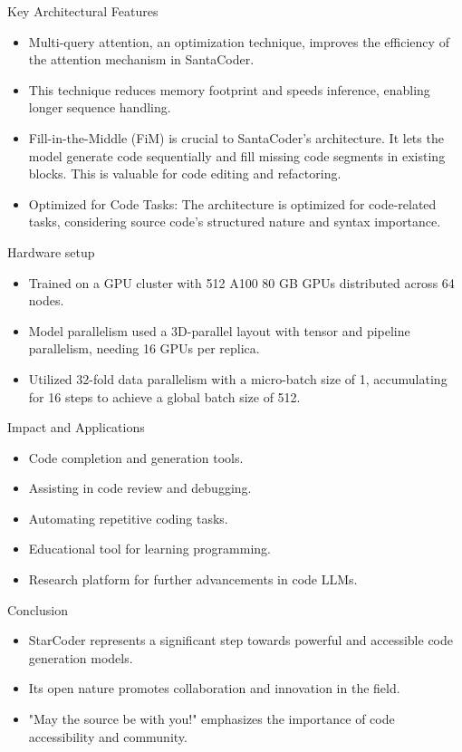 \begin{frame}{Key Architectural Features}
\begin{itemize}
\item Multi-query attention, an optimization technique, improves the efficiency of the attention mechanism in SantaCoder.
\item This technique reduces memory footprint and speeds inference, enabling longer sequence handling.
\item Fill-in-the-Middle (FiM) is crucial to SantaCoder’s architecture. It lets the model generate code sequentially and fill missing code segments in existing blocks. This is valuable for code editing and refactoring.
\item Optimized for Code Tasks:
The architecture is optimized for code-related tasks, considering source code’s structured nature and syntax importance.
\end{itemize}
\end{frame}

\begin{frame}{Hardware setup}
\begin{itemize}
\item Trained on a GPU cluster with 512 A100 80 GB GPUs distributed across 64 nodes.
\item Model parallelism used a 3D-parallel layout with tensor and pipeline parallelism, needing 16 GPUs per replica.
\item Utilized 32-fold data parallelism with a micro-batch size of 1, accumulating for 16 steps to achieve a global batch size of 512.

\end{itemize}
\end{frame}
\begin{frame}{Impact and Applications}
    \begin{itemize}
        \item Code completion and generation tools.
        \item Assisting in code review and debugging.
        \item Automating repetitive coding tasks.
        \item Educational tool for learning programming.
        \item Research platform for further advancements in code LLMs.
    \end{itemize}
\end{frame}

\begin{frame}{Conclusion}
    \begin{itemize}
        \item StarCoder represents a significant step towards powerful and accessible code generation models.
        \item Its open nature promotes collaboration and innovation in the field.
        \item "May the source be with you!" emphasizes the importance of code accessibility and community.
    \end{itemize}
\end{frame}
